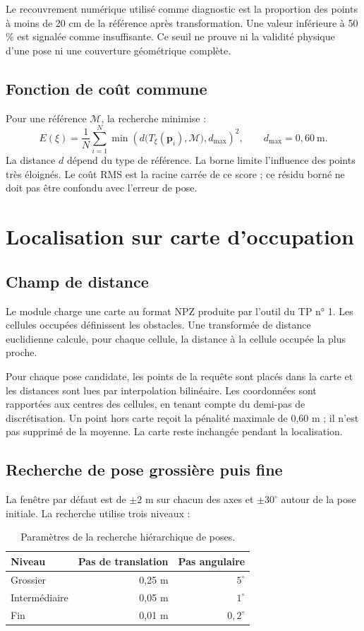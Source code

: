 \documentclass[11pt,a4paper]{article}
\newcommand{\code}[1]{\texttt{\detokenize{#1}}}
\begin{document}
Le recouvrement numérique utilisé comme diagnostic est la proportion des
points à moins de 20 cm de la référence après transformation. Une valeur
inférieure à 50\,\% est signalée comme insuffisante. Ce seuil ne prouve
ni la validité physique d'une pose ni une couverture géométrique complète.

\subsection{Fonction de coût commune}
Pour une référence $\mathcal M$, la recherche minimise :
\[
 E(\xi)=\frac1N\sum_{i=1}^{N}
 \min\!\left(d\bigl(T_\xi(\mathbf p_i),\mathcal M\bigr),d_{\max}\right)^2,
 \qquad d_{\max}=0{,}60\ \mathrm m.
\]
La distance $d$ dépend du type de référence. La borne limite l'influence
des points très éloignés. Le coût RMS est la racine carrée de ce score ;
ce résidu borné ne doit pas être confondu avec l'erreur de pose.

\section{Localisation sur carte d'occupation}
\subsection{Champ de distance}
Le module \code{localisation_grid.py} charge une carte au format NPZ
produite par l'outil du TP n° 1. Les cellules occupées définissent les
obstacles. Une transformée de distance euclidienne calcule, pour chaque
cellule, la distance à la cellule occupée la plus proche.

Pour chaque pose candidate, les points de la requête sont placés dans la
carte et les distances sont lues par interpolation bilinéaire. Les
coordonnées sont rapportées aux centres des cellules, en tenant compte
du demi-pas de discrétisation. Un point hors carte reçoit la pénalité
maximale de 0,60 m ; il n'est pas supprimé de la moyenne.
La carte reste inchangée pendant la localisation.

\subsection{Recherche de pose grossière puis fine}
La fenêtre par défaut est de $\pm2$ m sur chacun des axes et $\pm30^\circ$
autour de la pose initiale. La recherche utilise trois niveaux :
\begin{table}[h]
\centering
\caption{Paramètres de la recherche hiérarchique de poses.}
\begin{tabular}{lrr}
\toprule
Niveau & Pas de translation & Pas angulaire \\
\midrule
Grossier & 0,25 m & $5^\circ$ \\
Intermédiaire & 0,05 m & $1^\circ$ \\
Fin & 0,01 m & $0,2^\circ$ \\
\bottomrule
\end{tabular}
\end{table}
\end{document}
